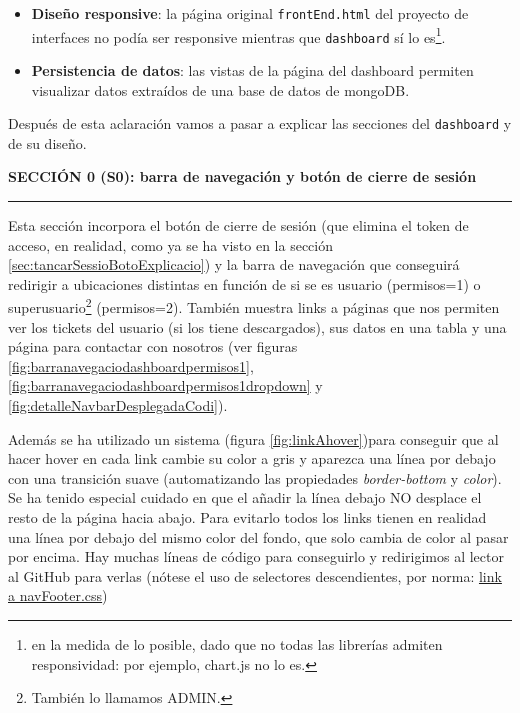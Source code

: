 \documentclass[a4paper,12pt]{report}
\begin{document}
	\vspace{-.8em}
	\begin{itemize}
		\setlength{\itemsep}{-.2em}
		\item \textbf{Diseño responsive}: la página original \texttt{frontEnd.html} del proyecto de interfaces no podía ser responsive mientras que \texttt{dashboard} sí lo es\footnote{en la medida de lo posible, dado que no todas las librerías admiten responsividad: por ejemplo, chart.js no lo es.}.
		\item \textbf{Persistencia de datos}: las vistas de la página del dashboard permiten visualizar datos extraídos de una base de datos de mongoDB.
	\end{itemize}
	
	\noindent Después de esta aclaración vamos a pasar a explicar las secciones del \texttt{dashboard} y de su diseño.
	
	
	
	\noindent \textbf{SECCIÓN 0 (S0): barra de navegación y botón de cierre de sesión}
	\hrule
	\vspace{.5em}
	
	Esta sección incorpora el botón de cierre de sesión (que elimina el token de acceso, en realidad, como ya se ha visto en la sección \ref{sec:tancarSessioBotoExplicacio}) y la barra de navegación que conseguirá redirigir a ubicaciones distintas en función de si se es usuario (permisos=1) o superusuario\footnote{También lo llamamos ADMIN.} (permisos=2). También muestra links a páginas que nos permiten ver los tickets del usuario (si los tiene descargados), sus datos en una tabla y una página para contactar con nosotros (ver figuras \ref{fig:barranavegaciodashboardpermisos1}, \ref{fig:barranavegaciodashboardpermisos1dropdown} y \ref{fig:detalleNavbarDesplegadaCodi}).
	
	Además se ha utilizado un sistema (figura \ref{fig:linkAhover})para conseguir que al hacer hover en cada link cambie su color a gris y aparezca una línea por debajo con una transición suave (automatizando las propiedades \textit{border-bottom} y \textit{color}). Se ha tenido especial cuidado en que el añadir la línea debajo NO desplace el resto de la página hacia abajo. Para evitarlo todos los links tienen en realidad una línea por debajo del mismo color del fondo, que solo cambia de color al pasar por encima. Hay muchas líneas de código para conseguirlo y redirigimos al lector al GitHub para verlas (nótese el uso de selectores descendientes, por norma: \href{https://github.com/blackcub3s/mercApp/blob/main/APP%20WEB/__frontend__produccio__/app/css/dashboard/navFooter.css}{link a navFooter.css})
	
\end{document}
